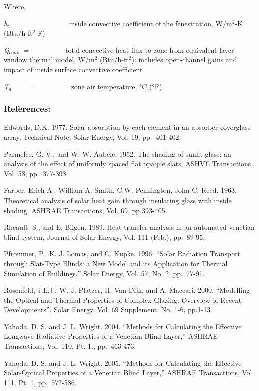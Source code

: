 Where,

\emph{h\(_{c}\)~~~~ = ~~~~~~~~~} inside convective coefficient of the fenestration, W/m\(^{2}\)-K (Btu/h-ft\(^{2}\)-F)

\emph{Q\(_{conv}\)~= ~~~~~~~~~} total convective heat flux to zone from equivalent layer window thermal model, W/m\(^{2}\) (Btu/h-ft\(^{2}\)); includes open-channel gains and impact of inside surface convective coefficient

\emph{T\(_{a}\)~~~~ = ~~~~~~~~~} zone air temperature, °C (°F)

\subsubsection{References:}\label{references-2-009}

Edwards, D.K. 1977. Solar absorption by each element in an absorber-coverglass array, Technical Note, Solar Energy, Vol. 19, pp.~401-402.

Parmelee, G. V., and W. W. Aubele. 1952. The shading of sunlit glass: an analysis of the effect of uniformly spaced flat opaque slats, ASHVE Transactions, Vol. 58, pp.~377-398.

Farber, Erich A.; William A. Smith, C.W. Pennington, John C. Reed. 1963. Theoretical analysis of solar heat gain through insulating glass with inside shading. ASHRAE Transactions, Vol. 69, pp.393-405.

Rheault, S., and E. Bilgen. 1989. Heat transfer analysis in an automated venetian blind system, Journal of Solar Energy, Vol. 111 (Feb.), pp.~89-95.

Pfrommer, P., K. J. Lomas, and C. Kupke. 1996. ``Solar Radiation Transport through Slat-Type Blinds: a New Model and its Application for Thermal Simulation of Buildings,'' Solar Energy, Vol. 57, No. 2, pp.~77-91.

Rosenfeld, J.L.J., W. J. Platzer, H. Van Dijk, and A. Maccari. 2000. ``Modelling the Optical and Thermal Properties of Complex Glazing: Overview of Recent Developments'', Solar Energy, Vol. 69 Supplement, No. 1-6, pp.1-13.

Yahoda, D. S. and J. L. Wright. 2004. ``Methods for Calculating the Effective Longwave Radiative Properties of a Venetian Blind Layer,'' ASHRAE Transactions, Vol. 110, Pt. 1., pp.~463-473.

Yahoda, D. S. and J. L. Wright. 2005. ``Methods for Calculating the Effective Solar-Optical Properties of a Venetian Blind Layer,'' ASHRAE Transactions, Vol. 111, Pt. 1, pp.~572-586.

